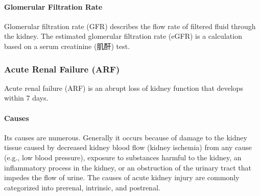 \documentclass[11pt]{article}
\begin{document}
\paragraph{Glomerular Filtration Rate} Glomerular filtration rate (GFR) describes the flow rate of filtered fluid through the kidney. The estimated glomerular filtration rate (eGFR) is a calculation based on a serum creatinine (肌酐) test. 


\subsubsection{Acute Renal Failure (ARF)}
Acute renal failure (ARF) is an abrupt loss of kidney function that develops within 7 days. 

\paragraph{Causes} Its causes are numerous. Generally it occurs because of damage to the kidney tissue caused by decreased kidney blood flow (kidney ischemia) from any cause (e.g., low blood pressure), exposure to substances harmful to the kidney, an inflammatory process in the kidney, or an obstruction of the urinary tract that impedes the flow of urine. The causes of acute kidney injury are commonly categorized into prerenal, intrinsic, and postrenal.
\end{document}
